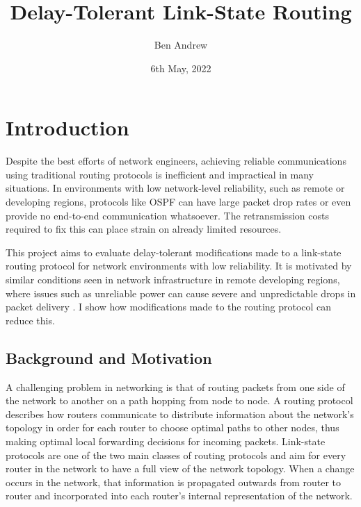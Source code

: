 \documentclass[withindex,glossary,openany]{cam-thesis}
\title{Delay-Tolerant Link-State Routing}
\author{Ben Andrew}
\date{6th May, 2022}
\begin{document}
\frontmatter{}



\listoffigures


\pagebreak

\chapter{Introduction}


Despite the best efforts of network engineers, achieving reliable communications using traditional routing protocols is inefficient and impractical in many situations. In environments with low network-level reliability, such as remote or developing regions, protocols like OSPF can have large packet drop rates or even provide no end-to-end communication whatsoever. The retransmission costs required to fix this can place strain on already limited resources.

This project aims to evaluate delay-tolerant modifications made to a link-state routing protocol for network environments with low reliability. It is motivated by similar conditions seen in network infrastructure in remote developing regions, where issues such as unreliable power can cause severe and unpredictable drops in packet delivery \cite{DEMMER2007}. I show how modifications made to the routing protocol can reduce this.


\section{Background and Motivation}

A challenging problem in networking is that of routing packets from one side of the network to another on a path hopping from node to node. A routing protocol describes how routers communicate to distribute information about the network's topology in order for each router to choose optimal paths to other nodes, thus making optimal local forwarding decisions for incoming packets. Link-state protocols \cite{LSR_PROTOCOL} are one of the two main classes of routing protocols and aim for every router in the network to have a full view of the network topology. When a change occurs in the network, that information is propagated outwards from router to router and incorporated into each router's internal representation of the network.
\end{document}
